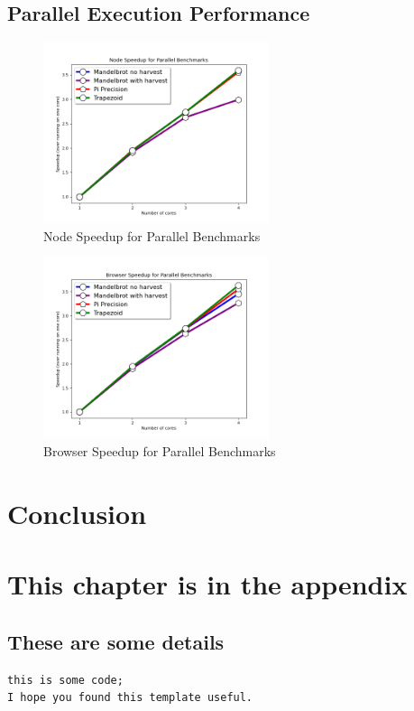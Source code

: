 \documentclass[12pt, a4paper]{report}
\theoremstyle{definition}
\theoremstyle{definition}%
\theoremstyle{definition}%
\theoremstyle{definition}%
\theoremstyle{definition}%
\theoremstyle{definition}%
\begin{document}
\section{Parallel Execution Performance}
\begin{figure}[H]
    \begin{centering}
        \includegraphics[width=250px]{../../benchmarks/visualisations/node_speedup.png}
        \caption{Node Speedup for Parallel Benchmarks}
    \end{centering}
\end{figure}
\begin{figure}[H]
    \begin{centering}
        \includegraphics[width=250px]{../../benchmarks/visualisations/browser_speedup.png}
        \caption{Browser Speedup for Parallel Benchmarks}
    \end{centering}
\end{figure}
\chapter{Conclusion}

\appendix

\chapter{This chapter is in the appendix}
\section{These are some details}
\begin{lstlisting}
this is some code;
I hope you found this template useful.
\end{lstlisting}


\bibliomatter





 
\end{document}
